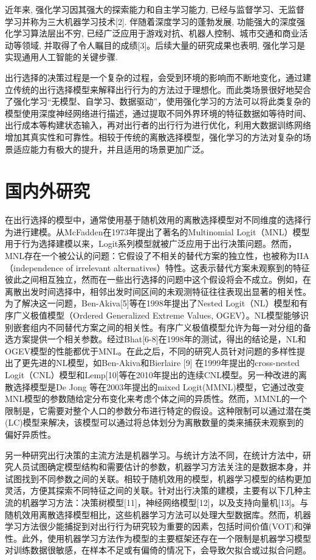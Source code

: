 近年来, 强化学习因其强大的探索能力和自主学习能力, 已经与监督学习、无监督学习并称为三大机器学习技术[2]. 伴随着深度学习的蓬勃发展, 功能强大的深度强化学习算法层出不穷, 已经广泛应用于游戏对抗、机器人控制、城市交通和商业活动等领域, 并取得了令人瞩目的成绩[3]。后续大量的研究成果也表明, 强化学习是实现通用人工智能的关键步骤.

出行选择的决策过程是一个复杂的过程，会受到环境的影响而不断地变化，通过建立传统的出行选择模型来解释出行行为的方法过于理想化。而此类场景很好地契合了强化学习“无模型、自学习、数据驱动”，使用强化学习的方法可以将此类复杂的模型使用深度神经网络进行描述，通过提取不同外界环境的特征数据如等待时间、出行成本等构建状态输入，再对出行者的出行行为进行优化，利用大数据训练网络增加其真实性和可靠性。相较于传统的离散选择模型，强化学习的方法对复杂的场景适应能力有极大的提升，并且适用的场景更加广泛。


\section{国内外研究}


在出行选择的模型中，通常使用基于随机效用的离散选择模型对不同维度的选择行为进行建模。从McFadden\cite{mcfadden1973conditional}在1973年提出了著名的Multinomial Logit（MNL）模型用于行为选择建模以来，Logit系列模型就被广泛应用于出行决策问题。然而，MNL存在一个被公认的问题：它假设了不相关的替代方案的独立性，也被称为IIA（independence of irrelevant alternatives）特性。这表示替代方案未观察到的特征彼此之间相互独立，然而在一些出行选择的问题中这个假设将会不成立。例如，在离散出发时间选择中，相邻出发时间区间的未观测特征往往表现出显著的相关性。为了解决这一问题，Ben-Akiva[5]等在1998年提出了Nested Logit（NL）模型和有序广义极值模型（Ordered Generalized Extreme Values, OGEV）。NL模型能够识别嵌套组内不同替代方案之间的相关性。有序广义极值模型允许为每一对分组的备选方案提供一个相关参数。经过Bhat[6-8]在1998年的测试，得出的结论是，NL和OGEV模型的性能都优于MNL。在此之后，不同的研究人员针对问题的多样性提出了更先进的NL模型，如Ben-Akiva和Bierlaire [9] 在1999年提出的cross-nested Logit（CNL）模型和Lemp[10]等在2010年提出的连续CNL模型。另一种改进的离散选择模型是De Jong 等在2003年提出的mixed Logit(MMNL)模型\cite{de2003model}，它通过改变MNL模型的参数随给定分布变化来考虑个体之间的异质性。然而，MMNL的一个限制是，它需要对整个人口的参数分布进行特定的假设。这种限制可以通过潜在类(LC)模型来解决，该模型可以通过将总体划分为离散数量的类来捕获未观察到的偏好异质性\cite{fukuda2010semiparametric}。

另一种研究出行决策的主流方法是机器学习。与统计方法不同，在统计方法中，研究人员试图确定模型结构和需要估计的参数，机器学习方法关注的是数据本身，并试图找到不同参数之间的关联。相较于随机效用的模型，机器学习模型的结构更加灵活，方便其探索不同特征之间的关联。针对出行决策的建模，主要有以下几种主流的机器学习方法：决策树模型[11]，神经网络模型[12]，以及支持向量机[13]。与随机效用离散选择模型相比，这些机器学习方法可以处理大型数据库。然而，机器学习方法很少能捕捉到对出行行为研究较为重要的因素，包括时间价值(VOT)和弹性。此外，使用机器学习方法作为模型的主要框架还存在一个限制是机器学习模型对训练数据很敏感，在样本不足或有偏倚的情况下，会导致欠拟合或过拟合问题。

